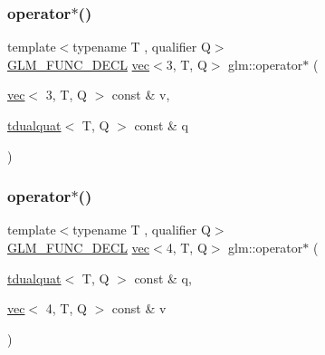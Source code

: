 \mbox{\label{group__gtx__dual__quaternion_ga84dc00cb210525a28d3a185c9a0ba176}} 
\subsubsection{\texorpdfstring{operator$\ast$()}{operator*()}\hspace{0.1cm}{\footnotesize\ttfamily [3/7]}}
{\footnotesize\ttfamily template$<$typename T , qualifier Q$>$ \\
\hyperlink{setup_8hpp_ab2d052de21a70539923e9bcbf6e83a51}{G\+L\+M\+\_\+\+F\+U\+N\+C\+\_\+\+D\+E\+CL} \hyperlink{structglm_1_1vec}{vec}$<$3, T, Q$>$ glm\+::operator$\ast$ (\begin{DoxyParamCaption}\item[{\hyperlink{structglm_1_1vec}{vec}$<$ 3, T, Q $>$ const \&}]{v,  }\item[{\hyperlink{structglm_1_1tdualquat}{tdualquat}$<$ T, Q $>$ const \&}]{q }\end{DoxyParamCaption})}

\mbox{\label{group__gtx__dual__quaternion_ga5e415497e00977106ec263f86b61e84c}} 
\subsubsection{\texorpdfstring{operator$\ast$()}{operator*()}\hspace{0.1cm}{\footnotesize\ttfamily [4/7]}}
{\footnotesize\ttfamily template$<$typename T , qualifier Q$>$ \\
\hyperlink{setup_8hpp_ab2d052de21a70539923e9bcbf6e83a51}{G\+L\+M\+\_\+\+F\+U\+N\+C\+\_\+\+D\+E\+CL} \hyperlink{structglm_1_1vec}{vec}$<$4, T, Q$>$ glm\+::operator$\ast$ (\begin{DoxyParamCaption}\item[{\hyperlink{structglm_1_1tdualquat}{tdualquat}$<$ T, Q $>$ const \&}]{q,  }\item[{\hyperlink{structglm_1_1vec}{vec}$<$ 4, T, Q $>$ const \&}]{v }\end{DoxyParamCaption})}

